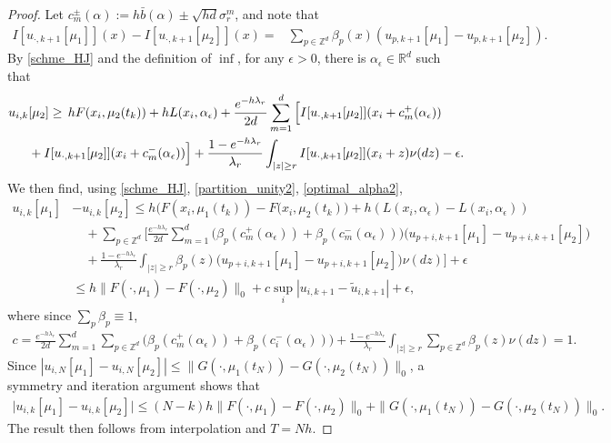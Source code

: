 \documentclass[a4paper,  twoside, 10pt, leqno]{amsart}
\newcommand{\Z}{\mathbb{Z}}
\newcommand{\R}{\mathbb{R}}
\theoremstyle{remark}
\theoremstyle{definition}
\begin{document}
\begin{proof}
Let $c^{\pm}_{m}(\alpha) :=  h \bar{b} (\alpha) \pm \sqrt{hd}
\sigma_r^m$, and note that
\begin{align}  \label{partition_unity2}
    I [u_{\cdot, k+1}[\mu_1]] ( x) - I[u _{\cdot,k+1}[\mu_2]]( x) = &  \sum_{p \in \Z^d} \beta_p (x) (u_{p,k+1}[\mu_1]- u _{p,k+1}[\mu_2] ) .
\end{align}
 By \eqref{schme_HJ} and the definition of $\inf$, for any $\epsilon>0$,
there is $\alpha_{\epsilon} \in \R^d$ such that  
\begin{align}
        u_{i,k}& [\mu_2]  \geq   \,h F  (  x_i,\mu_2(t_{k}) ) 
        + h L (x_{i}, \alpha_{\epsilon}) 
        +  \frac{e^{-h \lambda_r}}{2d} \sum_{m=1}^d \Big[ 
            I [ u_{\cdot, k+1}[\mu_2] ] (x_i + c^{+}_{m}(\alpha_{\epsilon})) \notag \\ 
    &+ I [ u_{\cdot,k+1}[\mu_2] ] (x_i+ c^{-}_{m}(\alpha_{\epsilon})) \Big] + \frac{1-e^{-h\lambda_r}}{\lambda_r} \int_{|z| \geq r} I [ u_{\cdot,k+1}[\mu_2] ] (x_i+z) \nu (dz) - \epsilon.
    \label{optimal_alpha2}
\end{align}
We then find, using \eqref{schme_HJ}, \eqref{partition_unity2}, 
\eqref{optimal_alpha2},
\begin{align*}
  u_{i,k}[\mu_1]  & - u_{i,k}[\mu_2]  \leq  h \big( F  (  x_i,\mu_1(t_{k}) ) - F  (  x_i,\mu_2(t_{k}) \big) + h ( L (x_{i}, \alpha_{\epsilon}) - L (x_{i}, \alpha_{\epsilon}) ) \\
     &\quad  +   \sum_{p \in \Z^d} \bigg[ \frac{e^{-h \lambda_r}}{2d} \sum_{m=1}^d \Big(\beta_p ( c^{+}_{m}(\alpha_{\epsilon}))  + \beta_p( c^{-}_{m}(\alpha_{\epsilon})) \Big)\big(u_{p+i,k+1}[\mu_1] - u_{p+i,k+1}[\mu_2] \big) \\
     &\quad  + \frac{1-e^{-h\lambda_r}}{\lambda_r} \int_{|z| \geq r}
    \beta_p (z) \big(u_{p+i,k+1}[\mu_1] - u_{p+i,k+1}[\mu_2]\big) \nu (dz) \bigg] + \epsilon\\
  &\leq h \| F(\cdot,\mu_1) - F(\cdot,\mu_2)   \|_{0} + c\sup_i |u_{i,k+1} - \tilde{u}_{i,k+1}| + \epsilon,
\end{align*}
where since  $\sum_p
\beta_p\equiv 1$, 
\begin{align*}
  c=\frac{e^{-h \lambda_r}}{2d} \sum_{m=1}^d\sum_{p \in \Z^d}  \Big(\beta_p ( c^{+}_{m}(\alpha_{\epsilon}))  + \beta_p( c^{-}_{i}(\alpha_{\epsilon})) \Big)+ \frac{1-e^{-h\lambda_r}}{\lambda_r} \int_{|z| \geq r}
  \sum_{p \in \Z^d}\beta_p (z) \nu (dz)=1.
\end{align*}
Since 
$|u_{i,N}[\mu_1] - u_{i,N}[\mu_2] | \leq \| G(\cdot,\mu_1(t_N)) - G(\cdot,\mu_2(t_N)) \|_0 $, a symmetry and
iteration argument shows that
\begin{align*} 
    \big|u_{i,k}[\mu_1] - u _{i,k}[\mu_2]\big| \leq ( N-k ) h  \| F(\cdot,\mu_1) - F(\cdot,\mu_2) \|_0 +  \| G(\cdot,\mu_1(t_N)) - G(\cdot,\mu_2(t_N)) \|_0 .
\end{align*}
The result then follows from interpolation and $T = Nh$.
\end{proof}
\end{document}

